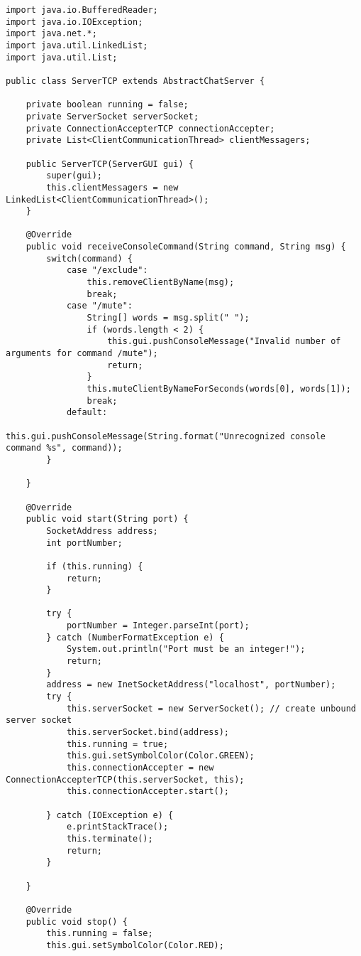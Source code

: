 \begin{enumerate}
\begin{lstlisting}[style=java]
import java.io.BufferedReader;
import java.io.IOException;
import java.net.*;
import java.util.LinkedList;
import java.util.List;

public class ServerTCP extends AbstractChatServer {

    private boolean running = false;
    private ServerSocket serverSocket;
    private ConnectionAccepterTCP connectionAccepter;
    private List<ClientCommunicationThread> clientMessagers;

    public ServerTCP(ServerGUI gui) {
        super(gui);
        this.clientMessagers = new LinkedList<ClientCommunicationThread>();
    }

    @Override
    public void receiveConsoleCommand(String command, String msg) {
        switch(command) {
            case "/exclude":
                this.removeClientByName(msg);
                break;
            case "/mute":
                String[] words = msg.split(" ");
                if (words.length < 2) {
                    this.gui.pushConsoleMessage("Invalid number of arguments for command /mute");
                    return;
                }
                this.muteClientByNameForSeconds(words[0], words[1]);
                break;
            default:
                this.gui.pushConsoleMessage(String.format("Unrecognized console command %s", command));
        }

    }

    @Override
    public void start(String port) {
        SocketAddress address;
        int portNumber;

        if (this.running) {
            return;
        }

        try {
            portNumber = Integer.parseInt(port);
        } catch (NumberFormatException e) {
            System.out.println("Port must be an integer!");
            return;
        }
        address = new InetSocketAddress("localhost", portNumber);
        try {
            this.serverSocket = new ServerSocket(); // create unbound server socket
            this.serverSocket.bind(address);
            this.running = true;
            this.gui.setSymbolColor(Color.GREEN);
            this.connectionAccepter = new ConnectionAccepterTCP(this.serverSocket, this);
            this.connectionAccepter.start();

        } catch (IOException e) {
            e.printStackTrace();
            this.terminate();
            return;
        }

    }

    @Override
    public void stop() {
        this.running = false;
        this.gui.setSymbolColor(Color.RED);


\end{lstlisting}
\end{enumerate}
